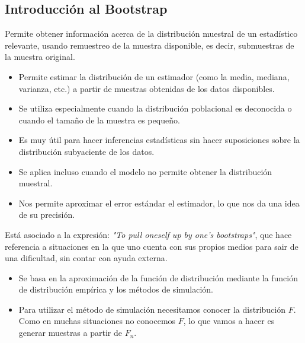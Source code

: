\subsection{Introducción al Bootstrap}
\begin{tcolorbox}[colback=blue!5!white, colframe=blue!75!black, title=\textbf{Bootstrap: una manera de evaluar la incertidumbre asociada a un estimador}]
Permite obtener información acerca de la distribución muestral de un estadístico relevante, usando remuestreo de la muestra disponible, es decir, submuestras de la muestra original.
\begin{itemize}[label=\textbullet]
    \item Permite estimar la distribución de un estimador (como la media, mediana, varianza, etc.) a partir de muestras obtenidas de los datos disponibles.
    \item Se utiliza especialmente cuando la distribución poblacional es deconocida o cuando el tamaño de la muestra es pequeño.
    \item Es muy útil para hacer inferencias estadísticas sin hacer suposiciones sobre la distribución subyaciente de los datos.
    \item Se aplica incluso cuando el modelo no permite obtener la distribución muestral.
    \item Nos permite aproximar el error estándar el estimador, lo que nos da una idea de su precisión.
\end{itemize}
\end{tcolorbox}
\begin{tcolorbox}[colback=olive!5!white, colframe=olive!75!black, title=\textbf{¿De dónde viene el nombre?}]
Está asociado a la expresión: \textit{"To pull oneself up by one's bootstraps"}, que hace referencia a situaciones en la que uno cuenta con sus propios medios para sair de una dificultad, sin contar con ayuda externa.
\end{tcolorbox}
\begin{itemize}[label=\textbullet]
    \item Se basa en la aproximación de la función de distribución mediante la función de distribución empírica y los métodos de simulación.
    \item Para utilizar el método de simulación necesitamos conocer la distribución $F$. Como en muchas situaciones no conocemos $F$, lo que vamos a hacer es generar muestras a partir de $F_n$.
\end{itemize}
